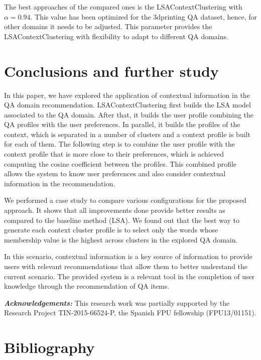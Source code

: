 \documentclass[preprint]{elsarticle}
\begin{document}
\begin{spacing}{1.5}
The best approaches of the compared ones is the LSAContextClustering with $\alpha=0.94$. This value has been optimized for the 3dprinting QA dataset, hence, for other domains it needs to be adjusted. This parameter provides the LSAContextClustering with flexibility to adapt to different QA domains.

\section{Conclusions and further study}
\label{sec:conclusions}

In this paper, we have explored the application of contextual information in the QA domain recommendation. LSAContextClustering first builds the LSA model associated to the QA domain. After that, it builds the user profile combining the QA profiles with the user preferences. In parallel, it builds the profiles of the context, which is separated in a number of clusters and a context profile is built for each of them. The following step is to combine the user profile with the context profile that is more close to their preferences, which is achieved computing the cosine coefficient between the profiles. This combined profile allows the system to know user preferences and also consider contextual information in the recommendation. 

We performed a case study to compare various configurations for the proposed approach. It shows that all improvements done provide better results as compared to the baseline method (LSA). We found out that the best way to generate each context cluster profile is to select only the words whose membership value is the highest across clusters in the explored QA domain.

In this scenario, contextual information is a key source of information to provide users with relevant recommendations that allow them to better understand the current scenario. The provided system is a relevant tool in the completion of user knowledge through the recommendation of QA items.

\textbf{\textit{Acknowledgements:}} This research work was partially supported by the Research Project TIN-2015-66524-P, the Spanish FPU fellowship (FPU13/01151).

\section*{Bibliography}



\end{spacing}
\end{document}
